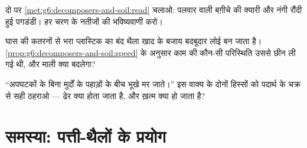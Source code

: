 \begin{exercise}[$\star\star$]\label{exo:g6:decomposers-and-soil:10}
दो  पर \cref{met:g6:decomposers-and-soil:read} चलाओ: पलवार
वाली बग़ीचे की क्यारी और नंगी रौंदी हुई पगडंडी। हर चरण के नतीजों की
भविष्यवाणी करो।
\end{exercise}

\begin{exercise}[$\star\star$]\label{exo:g6:decomposers-and-soil:11}
घास की कतरनों से भरा प्लास्टिक का बंद थैला खाद के बजाय बदबूदार लोई बन
जाता है। \cref{prop:g6:decomposers-and-soil:speed} के अनुसार काम की
कौन-सी परिस्थिति उससे छीन ली गई थी, और माली क्या बदलेगा?
\end{exercise}

\begin{exercise}[$\star\star\star$]\label{exo:g6:decomposers-and-soil:12}
``अपघटकों के बिना  मुर्दों के पहाड़ों के बीच भूखे मर जाते।'' इस
वाक्य के दोनों हिस्सों को पदार्थ के चक्र से सही ठहराओ --- ढेर क्या होता
जाता है, और ख़त्म क्या हो जाता है?
\end{exercise}

\section{समस्या: पत्ती-थैलों के प्रयोग}

